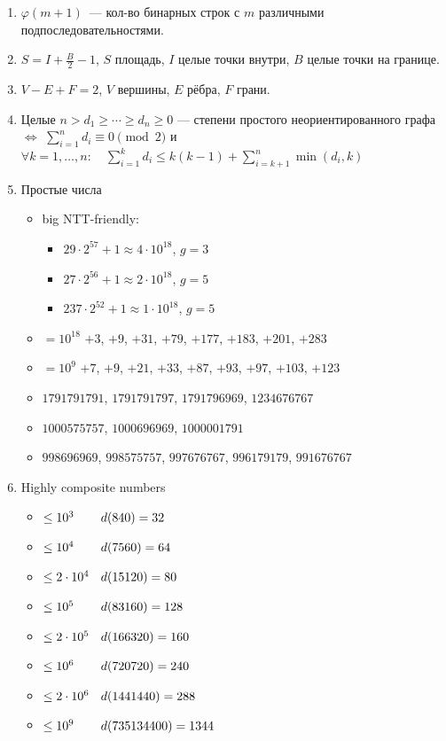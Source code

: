 \begin{enumerate}
\item %
$\varphi(m+1)$~--- кол-во бинарных строк с $m$ различными подпоследовательностями.

\item %
$S=I+\frac{B}{2}-1$, $S$ площадь, $I$ целые точки внутри, $B$ целые точки на границе.

\item %
$V-E+F=2$, $V$ вершины, $E$ рёбра, $F$ грани.

\item %
Целые $n>d_1\ge\cdots\ge d_n\ge0$ — степени простого неориентированного графа $\iff$
$\sum_{i=1}^n d_i\equiv0\pmod2$ и
\\ $\forall k=1,\ldots,n:\quad \sum_{i=1}^k d_i\le k(k-1)+\sum_{i=k+1}^n\min(d_i,k)$

\item Простые числа
\begin{itemize}
\item big NTT-friendly: \begin{itemize}
    \item $29 \cdot 2^{57} + 1 \approx 4 \cdot 10^{18}$, $g=3$
    \item $27 \cdot 2^{56} + 1 \approx 2 \cdot 10^{18}$, $g=5$
    \item $237 \cdot 2^{52} + 1 \approx 1 \cdot 10^{18}$, $g=5$
\end{itemize}
\item $=10^{18}$ $+3$, $+9$, $+31$, $+79$, $+177$, $+183$, $+201$, $+283$ 
\item $=10^9$ $+7$, $+9$, $+21$, $+33$, $+87$, $+93$, $+97$, $+103$, $+123$
\item $1791791791$, $1791791797$, $1791796969$, $1234676767$
\item $1000575757$, $1000696969$, $1000001791$
\item $998696969$, $998575757$, $997676767$, $996179179$, $991676767$
\end{itemize}

\item Highly composite numbers
\newcommand{\hcn}[2]{$\rlap{$\leq #1\ \ $}\phantom{\leq 2 \cdot 10^6\ \ }\; #2$}
\begin{itemize}
    \item \hcn{10^3}{d(840)=32}
    \item \hcn{10^4}{d(7560)=64}
    \item \hcn{2 \cdot 10^4}{d(15120)=80}
    \item \hcn{10^5}{d(83160)=128}
    \item \hcn{2 \cdot 10^5}{d(166320)=160}
    \item \hcn{10^6}{d(720720)=240}
    \item \hcn{2 \cdot 10^6}{d(1441440)=288}
    \item \hcn{10^9}{d(735134400)=1344}
\end{itemize}

\end{enumerate}

\endgroup






